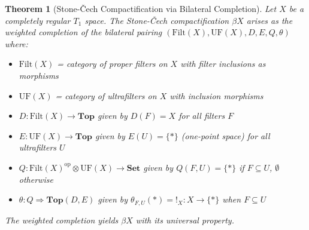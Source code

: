 \documentclass[11pt]{article}
\theoremstyle{plain}
\newtheorem{theorem}{Theorem}[section]
\theoremstyle{definition}
\theoremstyle{remark}
\newcommand{\op}{\mathrm{op}}
\begin{document}
\begin{theorem}[Stone-\v{C}ech Compactification via Bilateral Completion]\label{thm:stone-cech-bilateral}
Let $X$ be a completely regular $T_1$ space. The Stone-\v{C}ech compactification $\beta X$ arises as the weighted completion of the bilateral pairing $(\mathrm{Filt}(X), \mathrm{UF}(X), D, E, Q, \theta)$ where:
\begin{itemize}
\item $\mathrm{Filt}(X)$ = category of proper filters on $X$ with filter inclusions as morphisms
\item $\mathrm{UF}(X)$ = category of ultrafilters on $X$ with inclusion morphisms  
\item $D : \mathrm{Filt}(X) \to \mathbf{Top}$ given by $D(F) = X$ for all filters $F$
\item $E : \mathrm{UF}(X) \to \mathbf{Top}$ given by $E(U) = \{*\}$ (one-point space) for all ultrafilters $U$
\item $Q : \mathrm{Filt}(X)^{\op} \otimes \mathrm{UF}(X) \to \mathbf{Set}$ given by $Q(F, U) = \{*\}$ if $F \subseteq U$, $\emptyset$ otherwise
\item $\theta : Q \Rightarrow \mathbf{Top}(D, E)$ given by $\theta_{F,U}(*) = !_X : X \to \{*\}$ when $F \subseteq U$
\end{itemize}

The weighted completion yields $\beta X$ with its universal property.
\end{theorem}
\end{document}
